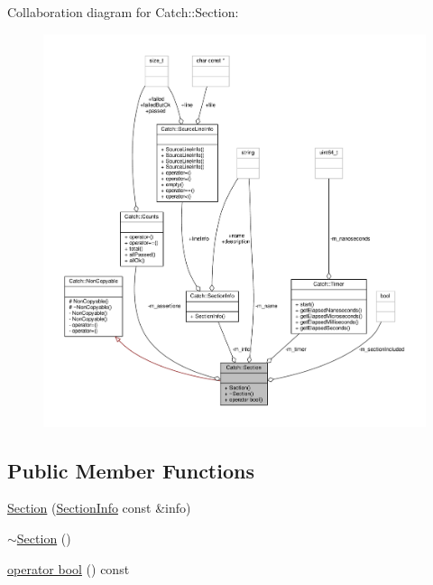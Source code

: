Collaboration diagram for Catch\-:\-:Section\-:
\nopagebreak
\begin{figure}[H]
\begin{center}
\leavevmode
\includegraphics[width=350pt]{class_catch_1_1_section__coll__graph}
\end{center}
\end{figure}
\subsection*{Public Member Functions}
\begin{DoxyCompactItemize}
\item 
\hyperlink{class_catch_1_1_section_a68fd4e51e8981aaa7ddb00d8a6abd099}{Section} (\hyperlink{struct_catch_1_1_section_info}{Section\-Info} const \&info)
\item 
\hyperlink{class_catch_1_1_section_aa1422edd68a77aa578b5cc6b8b69f86f}{$\sim$\-Section} ()
\item 
\hyperlink{class_catch_1_1_section_a6c9be48e8ba0611c4aa601102e706f3b}{operator bool} () const 
\end{DoxyCompactItemize}
